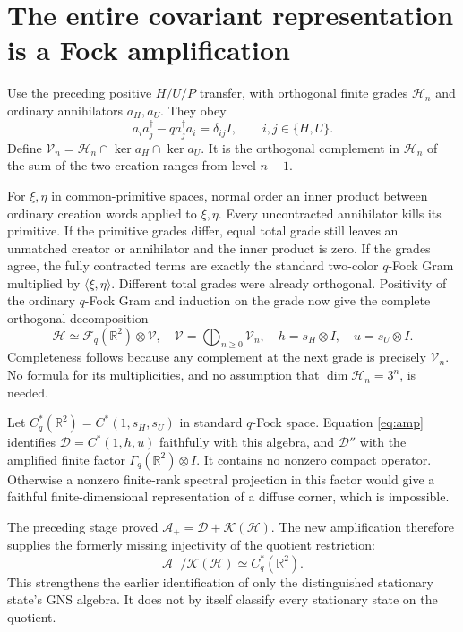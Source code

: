 \documentclass[11pt]{article}
\newcommand{\HH}{\mathcal H}
\newcommand{\KK}{\mathcal K}
\newcommand{\Alg}{\mathcal A}
\newcommand{\DD}{\mathcal D}
\begin{document}
\newpage
\section{The entire covariant representation is a Fock amplification}
Use the preceding positive $H/U/P$ transfer, with orthogonal finite
grades $\HH_n$ and ordinary annihilators $a_H,a_U$. They obey
\begin{equation}
 a_i a_j^\dagger-q a_j^\dagger a_i=\delta_{ij}I,
 \qquad i,j\in\{H,U\}.
\end{equation}
Define $\mathcal V_n=\HH_n\cap\ker a_H\cap\ker a_U$.
It is the orthogonal complement in $\HH_n$ of the sum of the
two creation ranges from level $n-1$.

For $\xi,\eta$ in common-primitive spaces, normal order an inner
product between ordinary creation words applied to $\xi,\eta$.
Every uncontracted annihilator kills its primitive. If the primitive
grades differ, equal total grade still leaves an unmatched creator
or annihilator and the inner product is zero. If the grades agree,
the fully contracted terms are exactly the standard two-color
$q$-Fock Gram multiplied by $\langle\xi,\eta\rangle$.
Different total grades were already orthogonal. Positivity of the
ordinary $q$-Fock Gram and induction on the grade now give the
complete orthogonal decomposition
\begin{equation}\label{eq:amp}
 \HH\simeq\mathcal F_q(\mathbb R^2)\otimes\mathcal V,
 \quad \mathcal V=\bigoplus_{n\ge0}\mathcal V_n,
 \quad h=s_H\otimes I,\quad u=s_U\otimes I.
\end{equation}
Completeness follows because any complement at the next grade is
precisely $\mathcal V_n$. No formula for its multiplicities, and no
assumption that $\dim\HH_n=3^n$, is needed.

Let $C_q^*(\mathbb R^2)=C^*(1,s_H,s_U)$ in standard $q$-Fock space.
Equation \eqref{eq:amp} identifies $\DD=C^*(1,h,u)$ faithfully with
this algebra, and $\DD''$ with the amplified finite factor
$\Gamma_q(\mathbb R^2)\otimes I$. It contains no nonzero compact
operator. Otherwise a nonzero finite-rank spectral projection in
this factor would give a faithful finite-dimensional representation
of a diffuse corner, which is impossible.

The preceding stage proved $\Alg_+=\DD+\KK(\HH)$. The new
amplification therefore supplies the formerly missing injectivity
of the quotient restriction:
\begin{equation}
 \Alg_+/\KK(\HH)\simeq C_q^*(\mathbb R^2).
\end{equation}
This strengthens the earlier identification of only the
distinguished stationary state's GNS algebra. It does not by itself
classify every stationary state on the quotient.
\end{document}
